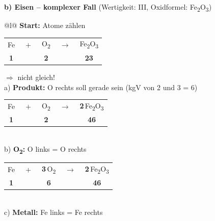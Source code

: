 \documentclass[10pt, a4paper]{article}
\newcommand{\lsg}[1]{\textcolor{loesung}{\textbf{#1}}}
\begin{document}
\vspace{8pt}

\textbf{b) Eisen – komplexer Fall} (Wertigkeit: III, Oxidformel: Fe\textsubscript{2}O\textsubscript{3})

\begin{tabular}{@{}l@{}}
\textbf{Start:} Atome zählen \\[0.3em]
\hspace{1em}\begin{tabular}[t]{@{}c@{}c@{}c@{}c@{}c@{}}
Fe & $\;+\;$ & O\textsubscript{2} & $\;\rightarrow\;$ & Fe\textsubscript{2}O\textsubscript{3} \\[-0.2em]
{\scriptsize\textcolor{metall}{\textbf{1}}} & & {\scriptsize\textcolor{sauerstoff}{\textbf{2}}} & & {\scriptsize\textcolor{metall}{\textbf{2}}\hspace{0.5em}\textcolor{sauerstoff}{\textbf{3}}}
\end{tabular} \quad $\Rightarrow$ nicht gleich! \\[0.8em]
%
a) \textbf{Produkt:} O rechts soll gerade sein (kgV von 2 und 3 = 6) \\[0.3em]
\hspace{1em}\begin{tabular}[t]{@{}c@{}c@{}c@{}c@{}c@{}}
Fe & $\;+\;$ & O\textsubscript{2} & $\;\rightarrow\;$ & \lsg{2}\,Fe\textsubscript{2}O\textsubscript{3} \\[-0.2em]
{\scriptsize\textcolor{metall}{\textbf{1}}} & & {\scriptsize\textcolor{sauerstoff}{\textbf{2}}} & & {\scriptsize\textcolor{metall}{\textbf{4}}\hspace{0.5em}\textcolor{sauerstoff}{\textbf{6}}}
\end{tabular} \\[0.8em]
%
b) \textbf{O\textsubscript{2}:} O links = O rechts \\[0.3em]
\hspace{1em}\begin{tabular}[t]{@{}c@{}c@{}c@{}c@{}c@{}}
Fe & $\;+\;$ & \lsg{3}\,O\textsubscript{2} & $\;\rightarrow\;$ & \lsg{2}\,Fe\textsubscript{2}O\textsubscript{3} \\[-0.2em]
{\scriptsize\textcolor{metall}{\textbf{1}}} & & {\scriptsize\textcolor{sauerstoff}{\textbf{6}}} & & {\scriptsize\textcolor{metall}{\textbf{4}}\hspace{0.5em}\textcolor{sauerstoff}{\textbf{6}}}
\end{tabular} \\[0.8em]
%
c) \textbf{Metall:} Fe links = Fe rechts \\[0.3em]

\end{tabular}
\end{document}
